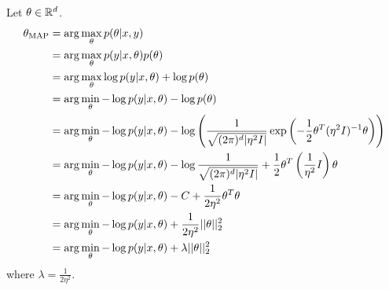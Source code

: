 \begin{answer}

Let $\theta \in {\mathbb R}^{{d}}$.
\begin{align*}
\theta_{\text{MAP}} &= \arg\max_\theta p(\theta|x,y) \\
&= \arg\max_\theta p(y|x,\theta) p(\theta) \\
&= \arg\max_\theta \log p(y|x,\theta) + \log p(\theta) \\
&= \arg\min_\theta -\log p(y|x,\theta) - \log p (\theta) \\
&= \arg\min_\theta -\log p(y|x,\theta) - \log\left(\frac{1}{\sqrt{(2\pi)^{{d}} |\eta^2I|}}\exp\left(-\frac{1}{2} \theta^T (\eta^2 I)^{-1} \theta\right)\right) \\
&= \arg\min_\theta -\log p(y|x,\theta) - \log\frac{1}{\sqrt{(2\pi)^{{d}} |\eta^2I|}} + \frac{1}{2} \theta^T \left(\frac{1}{\eta^2} I\right) \theta \\
&= \arg\min_\theta -\log p(y|x,\theta) - C + \frac{1}{2 \eta^2} \theta^T \theta \\
&= \arg\min_\theta -\log p(y|x,\theta) + \frac{1}{2 \eta^2} ||\theta||_2^2 \\
&= \arg\min_\theta -\log p(y|x,\theta) + \lambda||\theta||_2^2
\end{align*}
where $\lambda = \frac{1}{2\eta^2}$.

\end{answer}
